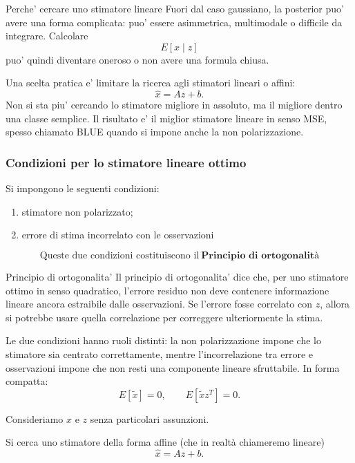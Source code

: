 \documentclass[11pt,a4paper]{article}
\begin{document}
\begin{spiegazione}{Perche' cercare uno stimatore lineare}
Fuori dal caso gaussiano, la posterior puo' avere una forma complicata: puo' essere asimmetrica, multimodale o difficile da integrare. Calcolare
\[
E[x\mid z]
\]
puo' quindi diventare oneroso o non avere una formula chiusa.

Una scelta pratica e' limitare la ricerca agli stimatori lineari o affini:
\[
\hat x=Az+b.
\]
Non si sta piu' cercando lo stimatore migliore in assoluto, ma il migliore dentro una classe semplice. Il risultato e' il miglior stimatore lineare in senso MSE, spesso chiamato BLUE quando si impone anche la non polarizzazione.
\end{spiegazione}

\subsubsection*{Condizioni per lo stimatore lineare ottimo}

Si impongono le seguenti condizioni:

\begin{enumerate}
    \item stimatore non polarizzato;
    \item errore di stima incorrelato con le osservazioni
\end{enumerate}
\[
\text{Queste due condizioni costituiscono il} \ \textbf{Principio di ortogonalità}
\]
 
 
\begin{spiegazione}{Principio di ortogonalita'}
Il principio di ortogonalita' dice che, per uno stimatore ottimo in senso quadratico, l'errore residuo non deve contenere informazione lineare ancora estraibile dalle osservazioni. Se l'errore fosse correlato con $z$, allora si potrebbe usare quella correlazione per correggere ulteriormente la stima.

Le due condizioni hanno ruoli distinti: la non polarizzazione impone che lo stimatore sia centrato correttamente, mentre l'incorrelazione tra errore e osservazioni impone che non resti una componente lineare sfruttabile. In forma compatta:
\[
E[\tilde x]=0,
\qquad
E[\tilde x z^T]=0.
\]
\end{spiegazione}

Consideriamo \(x\) e \(z\) senza particolari assunzioni. 

Si cerca uno stimatore della forma affine (che in realtà chiameremo lineare)
\[
\hat x = Az+b.
\]
\end{document}
